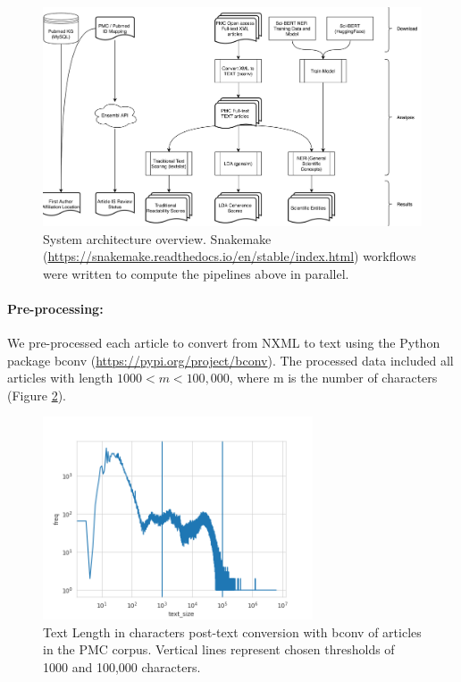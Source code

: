 \documentclass[11pt,a4paper]{article}
\begin{document}
\begin{center}
\begin{figure}
    \centering
    \includegraphics[width=15cm]{images/system-architecture.png}
    \caption{System architecture overview. Snakemake (\url{https://snakemake.readthedocs.io/en/stable/index.html}) workflows were written to compute the pipelines above in parallel.}
    \label{fig:system-overview}
\end{figure}
\end{center}

\paragraph{Pre-processing:}
We pre-processed each article to convert from NXML to text using the Python package bconv (\url{https://pypi.org/project/bconv}). The processed data included all articles with length \(1000 < m < 100,000\), where m is the number of characters (Figure \ref{fig:text-length}). 

\begin{figure}
    \centering
    \includegraphics[width=8cm]{images/pmc.text_size.lineplot.png}
    \caption{Text Length in characters post-text conversion with bconv of articles in the PMC corpus. Vertical lines represent chosen thresholds of 1000 and 100,000 characters.}
    \label{fig:text-length}
\end{figure}
\end{document}
